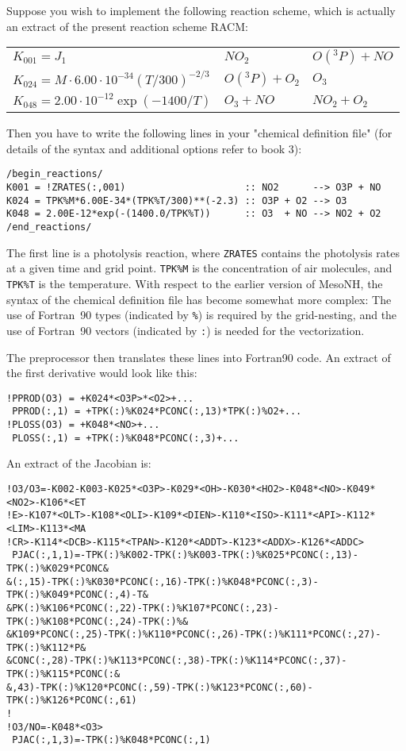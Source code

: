 Suppose you wish to implement the following reaction scheme, which is
actually an extract of the present reaction scheme RACM:

{\small
\begin{tabular}{l@{\,\,:\,\,}l@{\protect$\quad\longrightarrow\quad\protect$}l}
$K_{001} = J_1$ & $NO_{2}$ & $O({}^3P)+NO$ \\
$K_{024} = M \cdot 6.00\cdot10^{-34} \left( T / 300 \right)^{-2/3} $ 
         & $O({}^3P)+O_{2}$ & $O_{3}$ \\
$K_{048} = 2.00\cdot10^{-12} \exp\left( -1400/T \right)$ 
         & $O_{3}+NO$ & $NO_{2}+O_{2}$ 
\end{tabular}
}

Then you have to write the following lines in your
"chemical definition file" (for details of the syntax and additional 
options refer to book 3):

{\small
\begin{verbatim}
/begin_reactions/
K001 = !ZRATES(:,001)                     :: NO2      --> O3P + NO
K024 = TPK%M*6.00E-34*(TPK%T/300)**(-2.3) :: O3P + O2 --> O3
K048 = 2.00E-12*exp(-(1400.0/TPK%T))      :: O3  + NO --> NO2 + O2
/end_reactions/
\end{verbatim}
}
The first line is a photolysis reaction, where {\tt ZRATES} contains
the photolysis rates at a given time and grid point.
{\tt TPK\%M} is the concentration of air molecules, and {\tt TPK\%T} is
the temperature.  With respect to the earlier version of MesoNH,
the syntax of the chemical definition file has become somewhat more
complex: The use of Fortran~90 types (indicated by {\tt \%}) is
required by the grid-nesting, and the use of Fortran~90 vectors
(indicated by {\tt :}) is needed for the vectorization.

The preprocessor then translates these lines into Fortran90 code.
An extract of  the first derivative would look like this:
{\small
\begin{verbatim}
!PPROD(O3) = +K024*<O3P>*<O2>+...
 PPROD(:,1) = +TPK(:)%K024*PCONC(:,13)*TPK(:)%O2+...
!PLOSS(O3) = +K048*<NO>+...
 PLOSS(:,1) = +TPK(:)%K048*PCONC(:,3)+...
\end{verbatim}
}

An extract of the Jacobian is:
{\small
\begin{verbatim}
!O3/O3=-K002-K003-K025*<O3P>-K029*<OH>-K030*<HO2>-K048*<NO>-K049*<NO2>-K106*<ET
!E>-K107*<OLT>-K108*<OLI>-K109*<DIEN>-K110*<ISO>-K111*<API>-K112*<LIM>-K113*<MA
!CR>-K114*<DCB>-K115*<TPAN>-K120*<ADDT>-K123*<ADDX>-K126*<ADDC>
 PJAC(:,1,1)=-TPK(:)%K002-TPK(:)%K003-TPK(:)%K025*PCONC(:,13)-TPK(:)%K029*PCONC&
&(:,15)-TPK(:)%K030*PCONC(:,16)-TPK(:)%K048*PCONC(:,3)-TPK(:)%K049*PCONC(:,4)-T&
&PK(:)%K106*PCONC(:,22)-TPK(:)%K107*PCONC(:,23)-TPK(:)%K108*PCONC(:,24)-TPK(:)%&
&K109*PCONC(:,25)-TPK(:)%K110*PCONC(:,26)-TPK(:)%K111*PCONC(:,27)-TPK(:)%K112*P&
&CONC(:,28)-TPK(:)%K113*PCONC(:,38)-TPK(:)%K114*PCONC(:,37)-TPK(:)%K115*PCONC(:&
&,43)-TPK(:)%K120*PCONC(:,59)-TPK(:)%K123*PCONC(:,60)-TPK(:)%K126*PCONC(:,61)
!
!O3/NO=-K048*<O3>
 PJAC(:,1,3)=-TPK(:)%K048*PCONC(:,1)
\end{verbatim}
}

